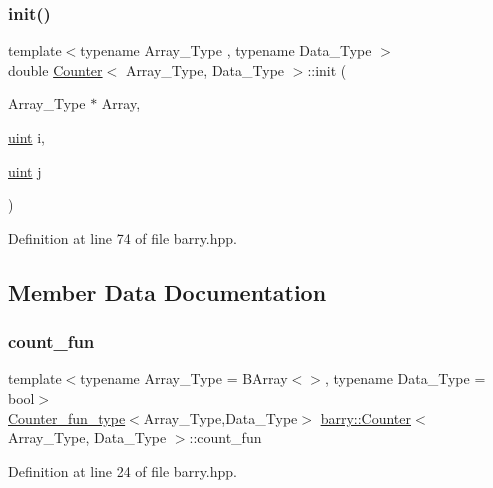 \subsubsection{\texorpdfstring{init()}{init()}}
{\footnotesize\ttfamily template$<$typename Array\+\_\+\+Type , typename Data\+\_\+\+Type $>$ \\
double \hyperlink{classbarry_1_1_counter}{Counter}$<$ Array\+\_\+\+Type, Data\+\_\+\+Type $>$\+::init (\begin{DoxyParamCaption}\item[{Array\+\_\+\+Type $\ast$}]{Array,  }\item[{\hyperlink{namespacebarry_a11dfc53ddb4672278319aa04f1e09a6c}{uint}}]{i,  }\item[{\hyperlink{namespacebarry_a11dfc53ddb4672278319aa04f1e09a6c}{uint}}]{j }\end{DoxyParamCaption})\hspace{0.3cm}{\ttfamily [inline]}}



Definition at line 74 of file barry.\+hpp.



\subsection{Member Data Documentation}
\mbox{\label{classbarry_1_1_counter_aa535e164838a3a9c780e8d15fe45679b}} 
\subsubsection{\texorpdfstring{count\+\_\+fun}{count\_fun}}
{\footnotesize\ttfamily template$<$typename Array\+\_\+\+Type  = B\+Array$<$$>$, typename Data\+\_\+\+Type  = bool$>$ \\
\hyperlink{namespacebarry_abaaae3200da8e4b7faac3c04fe9c3081}{Counter\+\_\+fun\+\_\+type}$<$Array\+\_\+\+Type,Data\+\_\+\+Type$>$ \hyperlink{classbarry_1_1_counter}{barry\+::\+Counter}$<$ Array\+\_\+\+Type, Data\+\_\+\+Type $>$\+::count\+\_\+fun}



Definition at line 24 of file barry.\+hpp.

\mbox{\label{classbarry_1_1_counter_af8196eeaaa4b58b788969c07aee7f1ee}} 
